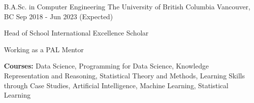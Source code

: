 

\begin{cventries}

  \cventry
    {B.A.Sc. in Computer Engineering} %
    {The University of British Columbia} %
    {Vancouver, BC} %
    {Sep 2018 - Jun 2023 (Expected)} %
    {
      \begin{cvitems} %
        \item {Head of School International Excellence Scholar}
        \item {Working as a PAL Mentor}
        \item {\textbf{Courses:} Data Science, Programming for Data Science, Knowledge Representation and Reasoning, Statistical Theory and Methods, Learning Skills through Case Studies, Artificial Intelligence, Machine Learning, Statistical Learning}
      \end{cvitems}
    }
\end{cventries}
